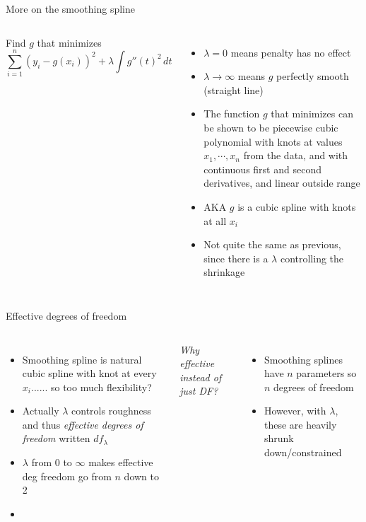 \documentclass[aspectratio=169,usenames,dvipsnames]{beamer}
\newcommand{\InstructorNotes}[1]{\textit{\color{orange}#1}}
\newcommand{\InstructorList}[1]{
\begin{itemize}
	\color{orange}
	#1
\end{itemize}
}
\begin{document}
\begin{frame}[t]{More on the smoothing spline }

\begin{columns}
\centering
Find $g$ that minimizes
\begin{equation*}
	\sum_{i=1}^n (y_i-g(x_i))^2 + \lambda \int g''(t)^2 \,dt
\end{equation*}

\centering

\InstructorList{
  \item $\lambda = 0$ means penalty has no effect
	\item $\lambda \to \infty$ means $g$ perfectly smooth (straight line)
	\item The function $g$ that minimizes can be shown to be piecewise cubic polynomial with knots at values $x_1,\cdots,x_n$ from the data, and with continuous first and second derivatives, and linear outside range
	\item AKA $g$ is a cubic spline with knots at all $x_i$
	\item Not quite the same as previous, since there is a $\lambda$ controlling the shrinkage
}

\end{columns}

\end{frame}

\begin{frame}[t]{Effective degrees of freedom}

\begin{columns}
\centering

\InstructorList{
  \item Smoothing spline is natural cubic spline with knot at every $x_i$...... so too much flexibility?
	\item Actually $\lambda$ controls roughness and thus \textit{effective degrees of freedom} written $df_\lambda$
	\item $\lambda$ from 0 to $\infty$ makes effective deg freedom go from $n$ down to 2
	\item
}

\centering

\InstructorNotes{Why effective instead of just DF?}
\InstructorList{
  \item Smoothing splines have $n$ parameters so $n$ degrees of freedom
	\item However, with $\lambda$, these are heavily shrunk down/constrained

}

\end{columns}

\end{frame}
\end{document}
